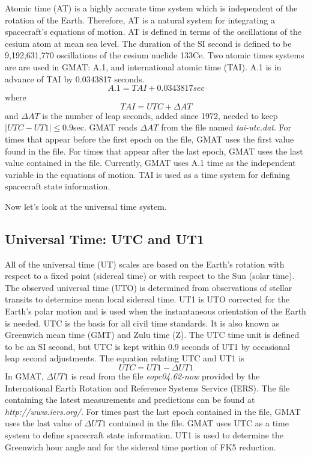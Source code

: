 Atomic time (AT) is a highly accurate time system which is
independent of the rotation of the Earth\cite{vallado2}.
Therefore, AT is a natural system for integrating a spacecraft's
equations of motion.  AT is defined in terms of the oscillations
of the cesium atom at mean sea level. The duration of the SI
second is defined to be 9,192,631,770 oscillations of the cesium
nuclide 133Ce. Two atomic times systems are are used in GMAT: A.1,
and international atomic time (TAI). A.1 is in advance of TAI by
0.0343817 seconds.
%
\begin{equation}
     A.1 = TAI + 0.0343817 sec
\end{equation}
%
where
%
\begin{equation}
   TAI = UTC + \Delta AT
\end{equation}
%
and $\Delta AT$ is the number of leap seconds, added since 1972,
needed to keep $\mid UTC - UT1 \mid \leq 0.9 $sec.  GMAT reads
$\Delta AT$ from the file named \emph{tai-utc.dat}. For times that
appear before the first epoch on the file, GMAT uses the first value
found in the file.  For times that appear after the last epoch, GMAT
uses the last value contained in the file.  Currently, GMAT uses A.1
time as the independent variable in the equations of motion. TAI is
used as a time system for defining spacecraft state information.

Now let's look at the universal time system.


\subsection{Universal Time: UTC and UT1}
 \label{Sec:UniversalTime}

All of the universal time (UT) scales are based on the Earth's
rotation with respect to a fixed point (sidereal time) or with
respect to the Sun (solar time). The observed universal time (UTO)
is determined from observations of stellar transits to determine
mean local sidereal time. UT1 is UTO corrected for the Earth's polar
motion and is used when the instantaneous orientation of the Earth
is needed.  UTC is the basis for all civil time standards. It is
also known as Greenwich mean time (GMT) and Zulu time (Z). The UTC
time unit is defined to be an SI second, but UTC is kept within 0.9
seconds of UT1 by occasional leap second adjustments.  The equation
relating UTC and UT1 is
%
\begin{equation}
    UTC = UT1 - \Delta UT1
\end{equation}
%
In GMAT,  $\Delta UT1$ is read from the file \emph{eopc04.62-now}
provided by the International Earth Rotation and Reference Systems
Service (IERS). The file containing the latest measurements and
predictions can be found at
\\\emph{http://www.iers.org/}. For times past the last epoch
contained in the file, GMAT uses the last value of $ \Delta UT1$
contained in the file. GMAT uses UTC as a time system to define
spacecraft state information. UT1 is used to determine the Greenwich
hour angle and for the sidereal time portion of FK5 reduction.


